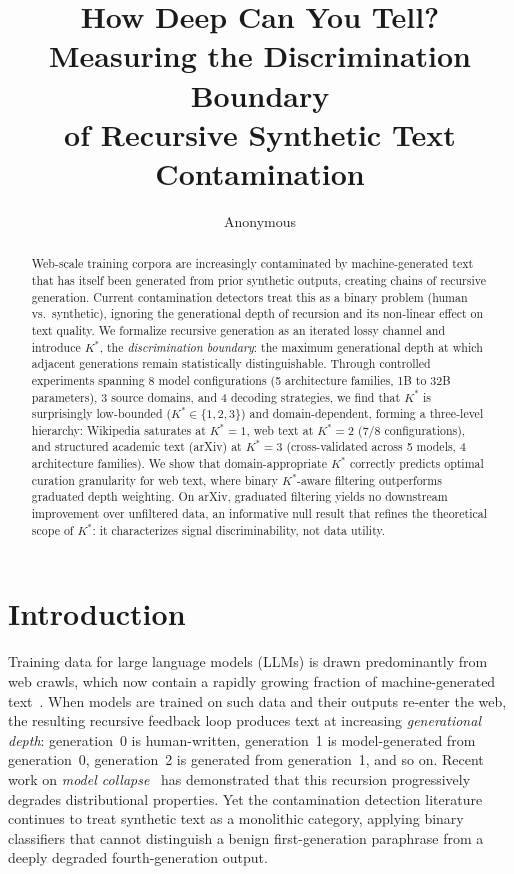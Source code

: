 \documentclass[11pt,a4paper]{article}
\title{How Deep Can You Tell? Measuring the Discrimination Boundary\\of Recursive Synthetic Text Contamination}
\author{Anonymous}
\date{}
\begin{document}
\maketitle

\begin{abstract}
Web-scale training corpora are increasingly contaminated by machine-generated text that has itself been generated from prior synthetic outputs, creating chains of recursive generation. Current contamination detectors treat this as a binary problem (human vs.\ synthetic), ignoring the generational depth of recursion and its non-linear effect on text quality. We formalize recursive generation as an iterated lossy channel and introduce $K^*$, the \emph{discrimination boundary}: the maximum generational depth at which adjacent generations remain statistically distinguishable. Through controlled experiments spanning 8 model configurations (5 architecture families, 1B to 32B parameters), 3 source domains, and 4 decoding strategies, we find that $K^*$ is surprisingly low-bounded ($K^* \in \{1,2,3\}$) and domain-dependent, forming a three-level hierarchy: Wikipedia saturates at $K^*\!=\!1$, web text at $K^*\!=\!2$ (7/8 configurations), and structured academic text (arXiv) at $K^*\!=\!3$ (cross-validated across 5 models, 4 architecture families). We show that domain-appropriate $K^*$ correctly predicts optimal curation granularity for web text, where binary $K^*$-aware filtering outperforms graduated depth weighting. On arXiv, graduated filtering yields no downstream improvement over unfiltered data, an informative null result that refines the theoretical scope of $K^*$: it characterizes signal discriminability, not data utility.
\end{abstract}

\section{Introduction}

Training data for large language models (LLMs) is drawn predominantly from web crawls, which now contain a rapidly growing fraction of machine-generated text~\citep{radford2019language,brown2020language}. When models are trained on such data and their outputs re-enter the web, the resulting recursive feedback loop produces text at increasing \emph{generational depth}: generation~0 is human-written, generation~1 is model-generated from generation~0, generation~2 is generated from generation~1, and so on. Recent work on \emph{model collapse}~\citep{shumailov2023curse,alemohammad2024selfconsuming,dohmatob2024tale} has demonstrated that this recursion progressively degrades distributional properties. Yet the contamination detection literature continues to treat synthetic text as a monolithic category, applying binary classifiers that cannot distinguish a benign first-generation paraphrase from a deeply degraded fourth-generation output.
\end{document}
